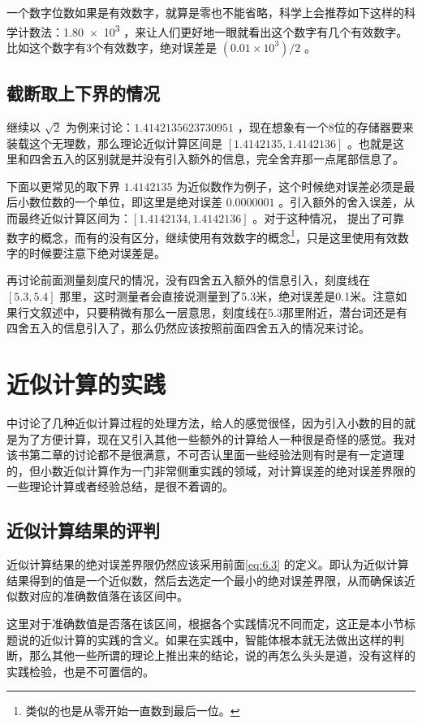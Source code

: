 \documentclass[12pt,oneside]{book}
\begin{document}
一个数字位数如果是有效数字，就算是零也不能省略，科学上会推荐如下这样的科学计数法：\num{1.80e3} ，来让人们更好地一眼就看出这个数字有几个有效数字。比如这个数字有3个有效数字，绝对误差是 $ (0.01 \times 10^{3}) /2 $ 。

\subsection{截断取上下界的情况}
继续以 $\sqrt{2}$ 为例来讨论：$ 1.4142135623730951 $ ，现在想象有一个8位的存储器要来装载这个无理数，那么理论近似计算区间是 $ [1.4142135, 1.4142136] $ 。也就是这里和四舍五入的区别就是并没有引入额外的信息，完全舍弃那一点尾部信息了。

下面以更常见的取下界 $ 1.4142135 $ 为近似数作为例子，这个时候绝对误差必须是最后小数位数的一个单位，即这里是绝对误差 $ 0.0000001 $ 。引入额外的舍入误差，从而最终近似计算区间为：$ [1.4142134, 1.4142136] $ 。对于这种情况，\cite{近似计算初步} 提出了可靠数字的概念，而有的没有区分，继续使用有效数字的概念\footnote{类似的也是从零开始一直数到最后一位。}，只是这里使用有效数字的时候要注意下绝对误差是。

再讨论前面测量刻度尺的情况，没有四舍五入额外的信息引入，刻度线在 $[5.3, 5.4]$ 那里，这时测量者会直接说测量到了5.3米，绝对误差是0.1米。注意如果行文叙述中，只要稍微有那么一层意思，刻度线在5.3那里附近，潜台词还是有四舍五入的信息引入了，那么仍然应该按照前面四舍五入的情况来讨论。

\section{近似计算的实践}
\cite{近似计算初步}中讨论了几种近似计算过程的处理方法，给人的感觉很怪，因为引入小数的目的就是为了方便计算，现在又引入其他一些额外的计算给人一种很是奇怪的感觉。我对该书第二章的讨论都不是很满意，不可否认里面一些经验法则有时是有一定道理的，但小数近似计算作为一门非常侧重实践的领域，对计算误差的绝对误差界限的一些理论计算或者经验总结，是很不着调的。

\subsection{近似计算结果的评判}
近似计算结果的绝对误差界限仍然应该采用前面\eqref{eq:6.3} 的定义。即认为近似计算结果得到的值是一个近似数，然后去选定一个最小的绝对误差界限，从而确保该近似数对应的准确数值落在该区间中。

这里对于准确数值是否落在该区间，根据各个实践情况不同而定，这正是本小节标题说的近似计算的实践的含义。如果在实践中，智能体根本就无法做出这样的判断，那么其他一些所谓的理论上推出来的结论，说的再怎么头头是道，没有这样的实践检验，也是不可置信的。
\end{document}
